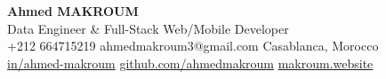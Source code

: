 \documentclass[10pt,a4paper,sans]{moderncv}
\begin{document}
\begin{center}
    {\fontsize{20}{22}\selectfont\textbf{Ahmed MAKROUM}}\\[0.7em]
    {\fontsize{13.2}{15.4}\selectfont Data Engineer \& Full-Stack Web/Mobile Developer} \\[0.5em]
    {\fontsize{10.5}{12.3}\selectfont
      \faMobile\enspace +212 664715219 \quad
      \faEnvelope\enspace ahmedmakroum3@gmail.com \quad
      \faHome\enspace Casablanca, Morocco \\
      \faLinkedin\enspace \href{https://www.linkedin.com/in/ahmed-makroum/}{in/ahmed-makroum} \quad
      \faGithub\enspace \href{https://github.com/ahmedmakroum}{github.com/ahmedmakroum}
      \faGlobe\enspace \href{https://makroum.website}{makroum.website}
    }\\[1em]
\end{center}
\vspace{-14pt}


\end{document}
